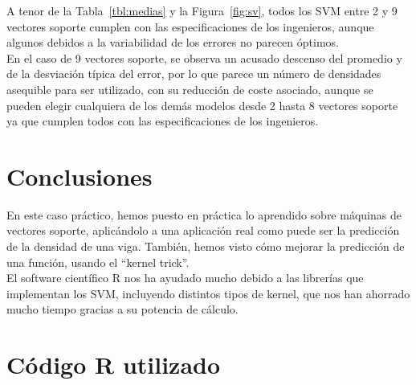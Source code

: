 \documentclass[12pt,a4paper,twoside,openright,titlepage,final]{article}
\begin{document}
A tenor de la Tabla~\ref{tbl:medias} y la Figura~\ref{fig:sv}, todos los SVM entre 2 y 9 vectores soporte cumplen con las especificaciones de los ingenieros, aunque algunos debidos a la variabilidad de los errores no parecen óptimos.\\

En el caso de 9 vectores soporte, se observa un acusado descenso del promedio y de la desviación típica del error, por lo que parece un número de densidades asequible para ser utilizado, con su reducción de coste asociado, aunque se pueden elegir cualquiera de los demás modelos desde 2 hasta 8 vectores soporte ya que cumplen todos con las especificaciones de los ingenieros.

\section{Conclusiones}

En este caso práctico, hemos puesto en práctica lo aprendido sobre máquinas de vectores soporte, aplicándolo a una aplicación real como puede ser la predicción de la densidad de una viga. También, hemos visto cómo mejorar la predicción de una función, usando el ``kernel trick''.\\

El software científico R nos ha ayudado mucho debido a las librerías que implementan los SVM, incluyendo distintos tipos de kernel, que nos han ahorrado mucho tiempo gracias a su potencia de cálculo. 

\clearpage

\section{Código R utilizado}


\end{document}
